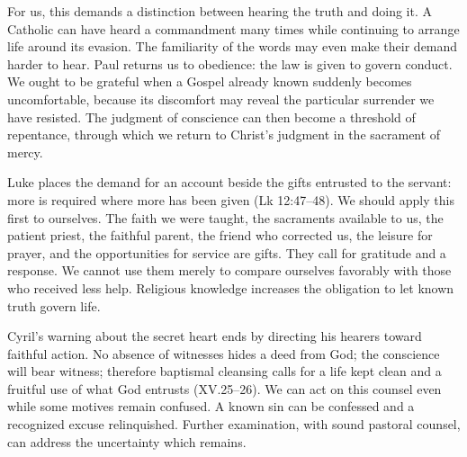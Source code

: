 For us, this demands a distinction between hearing the truth and doing it. A Catholic can have heard a commandment many times while continuing to arrange life around its evasion. The familiarity of the words may even make their demand harder to hear. Paul returns us to obedience: the law is given to govern conduct. We ought to be grateful when a Gospel already known suddenly becomes uncomfortable, because its discomfort may reveal the particular surrender we have resisted. The judgment of conscience can then become a threshold of repentance, through which we return to Christ's judgment in the sacrament of mercy.

Luke places the demand for an account beside the gifts entrusted to the servant: more is required where more has been given (Lk 12:47--48). We should apply this first to ourselves. The faith we were taught, the sacraments available to us, the patient priest, the faithful parent, the friend who corrected us, the leisure for prayer, and the opportunities for service are gifts. They call for gratitude and a response. We cannot use them merely to compare ourselves favorably with those who received less help. Religious knowledge increases the obligation to let known truth govern life.

Cyril's warning about the secret heart ends by directing his hearers toward faithful action. No absence of witnesses hides a deed from God; the conscience will bear witness; therefore baptismal cleansing calls for a life kept clean and a fruitful use of what God entrusts (XV.25--26). We can act on this counsel even while some motives remain confused. A known sin can be confessed and a recognized excuse relinquished. Further examination, with sound pastoral counsel, can address the uncertainty which remains.

